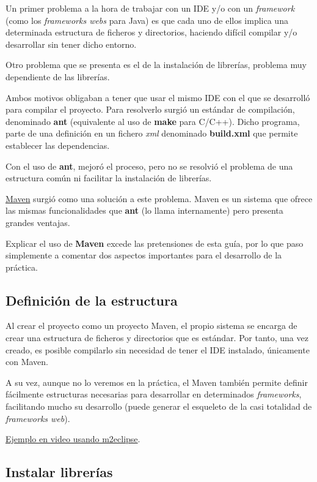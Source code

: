 \documentclass[11pt]{article}
\begin{document}
Un primer problema a la hora de trabajar con un IDE y/o con un \emph{framework} (como los \emph{frameworks webs} para Java) es que cada uno de ellos implica una determinada estructura de ficheros y
directorios, haciendo difícil compilar y/o desarrollar sin tener dicho entorno.


Otro problema que se presenta es el de la instalación de librerías, problema muy dependiente de las librerías. 


Ambos motivos obligaban a tener que usar el mismo IDE con el que se desarrolló para compilar el
proyecto. Para resolverlo surgió un estándar de compilación, denominado \textbf{ant} (equivalente al uso de
\textbf{make} para C/C++). Dicho programa, parte de una definición en un fichero \emph{xml} denominado
\textbf{build.xml} que permite establecer las dependencias.


Con el uso de \textbf{ant}, mejoró el proceso, pero no se resolvió el problema de una estructura común ni
facilitar la instalación de librerías.


\href{http://maven.apache.org/}{Maven} surgió como una solución a este problema. Maven es un sistema que ofrece las mismas funcionalidades
que \textbf{ant} (lo llama internamente) pero presenta grandes ventajas.


Explicar el uso de \textbf{Maven} excede las pretensiones de esta guía, por lo que paso simplemente a comentar dos
aspectos importantes para el desarrollo de la práctica.
\subsection{Definición de la estructura}
\label{sec-5-1}




Al crear el proyecto como un proyecto Maven, el propio sistema se encarga de crear una estructura de ficheros
y directorios que es estándar. Por tanto, una vez creado, es posible compilarlo sin necesidad de tener el IDE instalado, 
únicamente con Maven. 


A su vez, aunque no lo veremos en la práctica, el Maven también permite definir fácilmente estructuras necesarias para
desarrollar en determinados \emph{frameworks}, facilitando mucho su desarrollo (puede generar el esqueleto de la casi
totalidad de \emph{frameworks web}).


\href{http://www.youtube.com/watch?v%3DX8lu7Oi23YQ}{Ejemplo en video usando m2eclipse}.
\subsection{Instalar librerías}
\label{sec-5-2}
\end{document}
